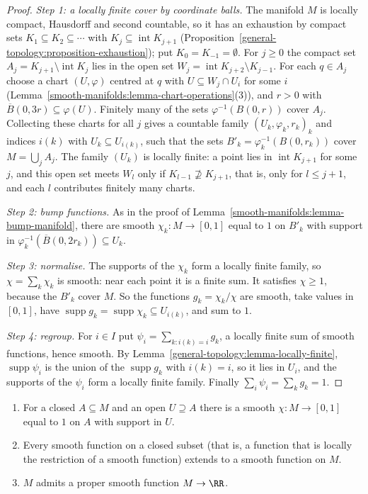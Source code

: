 \begin{proof}
\emph{Step 1: a locally finite cover by coordinate balls.} The manifold $M$ is locally compact, Hausdorff and second countable, so it has an exhaustion by
compact sets $K_1 \subseteq K_2 \subseteq \cdots$ with $K_j \subseteq \operatorname{int}K_{j+1}$ (Proposition~\ref{general-topology:proposition-exhaustion}); put
$K_0 = K_{-1} = \emptyset$. For $j \geq 0$ the compact set $A_j = K_{j+1} \setminus \operatorname{int}K_j$ lies in the open set
$W_j = \operatorname{int}K_{j+2} \setminus K_{j-1}$. For each $q \in A_j$ choose a chart $(U, \varphi)$ centred at $q$ with $U \subseteq W_j \cap U_i$ for some
$i$ (Lemma~\ref{smooth-manifolds:lemma-chart-operations}(3)), and $r > 0$ with $\overline{B}(0, 3r) \subseteq \varphi(U)$. Finitely many of the sets
$\varphi^{-1}(B(0, r))$ cover $A_j$. Collecting these charts for all $j$ gives a countable family $(U_k, \varphi_k, r_k)_k$ and indices $i(k)$ with
$U_k \subseteq U_{i(k)}$, such that the sets $B'_k = \varphi_k^{-1}(B(0, r_k))$ cover $M = \bigcup_jA_j$. The family $(U_k)$ is locally finite: a point lies in
$\operatorname{int}K_{j+1}$ for some $j$, and this open set meets $W_l$ only if $K_{l-1} \not\supseteq K_{j+1}$, that is, only for $l \leq j + 1$, and each $l$
contributes finitely many charts.

\emph{Step 2: bump functions.} As in the proof of Lemma~\ref{smooth-manifolds:lemma-bump-manifold}, there are smooth $\chi_k \colon M \to [0, 1]$ equal to $1$ on
$B'_k$ with support in $\varphi_k^{-1}(\overline{B}(0, 2r_k)) \subseteq U_k$.

\emph{Step 3: normalise.} The supports of the $\chi_k$ form a locally finite family, so $\chi = \sum_k\chi_k$ is smooth: near each point it is a finite sum. It
satisfies $\chi \geq 1$, because the $B'_k$ cover $M$. So the functions $g_k = \chi_k/\chi$ are smooth, take values in $[0, 1]$, have
$\operatorname{supp}g_k = \operatorname{supp}\chi_k \subseteq U_{i(k)}$, and sum to $1$.

\emph{Step 4: regroup.} For $i \in I$ put $\psi_i = \sum_{k : i(k) = i}g_k$, a locally finite sum of smooth functions, hence smooth. By
Lemma~\ref{general-topology:lemma-locally-finite}, $\operatorname{supp}\psi_i$ is the union of the $\operatorname{supp}g_k$ with $i(k) = i$, so it lies in
$U_i$, and the supports of the $\psi_i$ form a locally finite family. Finally $\sum_i\psi_i = \sum_kg_k = 1$.
\end{proof}

\begin{corollary}\label{smooth-manifolds:corollary-partition-applications}
\begin{enumerate}
\item For a closed $A \subseteq M$ and an open $U \supseteq A$ there is a smooth $\chi \colon M \to [0, 1]$ equal to $1$ on $A$ with support in $U$.
\item Every smooth function on a closed subset (that is, a function that is locally the restriction of a smooth function) extends to a smooth function on $M$.
\item $M$ admits a proper smooth function $M \to \RR$.
\end{enumerate}
\end{corollary}

